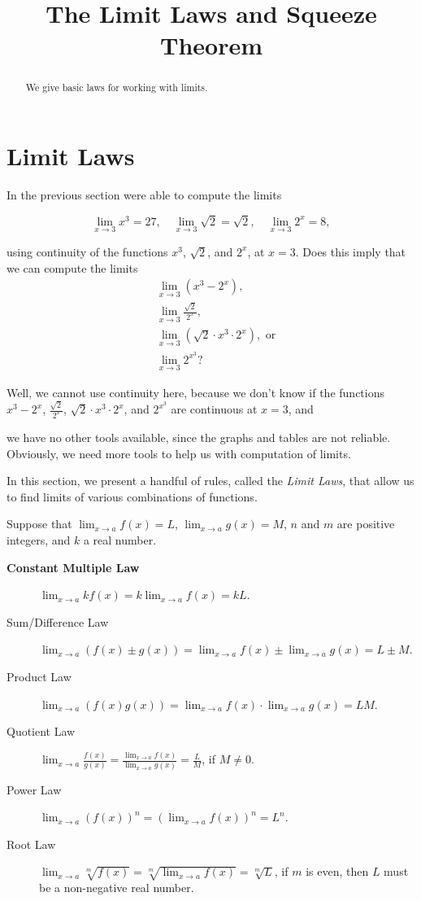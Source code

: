 \documentclass{ximera}
\title{The Limit Laws and Squeeze Theorem}
\begin{document}
\begin{abstract}
We give basic laws for working with limits. 
\end{abstract}
\maketitle
\section{Limit Laws}
In the previous section were able to compute the limits

\[
\lim_{x\to 3} x^3=27,\quad\lim_{x\to 3} \sqrt{2}=\sqrt{2},\quad\lim_{x\to 3} 2^x=8,
\]

using continuity of the functions $x^3$, $\sqrt{2}$, and $2^x$, at $x=3$.  Does this imply that we can compute the limits
\begin{align*}
  &\lim_{x\to 3} (x^3-2^x),\\
  &\lim_{x\to 3} \frac{\sqrt{2}}{2^x},\\
  &\lim_{x\to 3} (\sqrt{2}\cdot x^3\cdot 2^x), \text{ or}\\
  &\lim_{x\to 3} 2^{x^3}?
\end{align*}

Well, we cannot use continuity here, because we don't know if the
functions $x^3-2^x$, $\frac{\sqrt{2}}{2^x}$, $\sqrt{2}\cdot
x^3\cdot 2^{x}$, and $2^{x^3}$ are continuous at $x=3$, and

 we have no other tools available, since the graphs and tables are not reliable. Obviously, we need more tools to help us with computation of limits.

 

In this section, we present a handful of rules, called the \textit{Limit Laws},
that allow us to find limits of various combinations of functions.

\begin{theorem}\label{theorem:limit-laws}
Suppose that $\lim_{x\to a}f(x)=L$, $\lim_{x\to a}g(x)=M$, $n$ and $m$ are positive integers, and $k$ a real number.
\begin{description}
\item[\textbf{Constant Multiple Law}] $\lim_{x\to a} kf(x) = k\lim_{x\to a}f(x)=kL$.
\item[Sum/Difference Law] $\lim_{x\to a} (f(x) \pm g(x)) =
  \lim_{x\to a}f(x) \pm \lim_{x\to a}g(x)=L \pm M$.
\item[Product Law]  $\lim_{x\to a} (f(x)g(x)) = \lim_{x\to
  a}f(x)\cdot\lim_{x\to a}g(x)=LM$.
\item[Quotient Law]  $\lim_{x\to a} \frac{f(x)}{g(x)} =
  \frac{\lim_{x\to a}f(x)}{\lim_{x\to a}g(x)}=\frac{L}{M}$, if
  $M\ne0$.
\item[Power Law] $\lim_{x\to a} (f(x))^n=(\lim_{x\to a} f(x))^n=L^n$.
\item[Root Law] $\lim_{x\to a} \sqrt[m]{f(x)}=\sqrt[m]{\lim_{x\to a} f(x)}=\sqrt[m]{L}$, if $m$ is even, then $L$ must be a non-negative real number.
\end{description}
\label{thm:limit laws}
\end{theorem}
\end{document}
